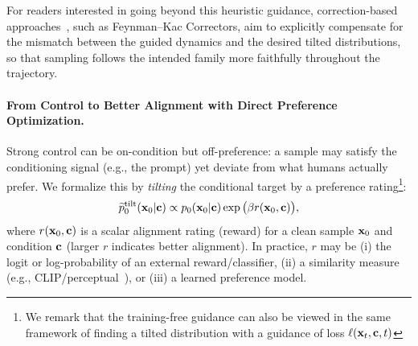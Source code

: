 {For readers interested in going beyond this heuristic guidance, correction-based approaches~\citep{skreta2025feynman}, such as Feynman--Kac Correctors, aim to explicitly compensate for the mismatch between the guided dynamics and the desired tilted distributions, so that sampling follows the intended family more faithfully throughout the trajectory.

}





\paragraph{From Control to Better Alignment with Direct Preference Optimization.}
Strong control can be on-condition but off-preference: a sample may satisfy the conditioning signal (e.g., the prompt) yet deviate from what humans actually prefer. We formalize this by \emph{tilting} the conditional target by a preference rating\footnote{We remark that the training-free guidance can also be viewed in the same framework of finding a tilted distribution with a guidance of loss $\ell({\mathbf{x}}_t, {\mathbf{c}}, t)$}:
\[
\widetilde p_0^{\mathrm{tilt}}({\mathbf{x}}_0| {\mathbf{c}}) \propto p_0({\mathbf{x}}_0|{\mathbf{c}}) \exp \big(\beta r({\mathbf{x}}_0,{\mathbf{c}})\big),
\]
where $r({\mathbf{x}}_0,{\mathbf{c}})$ is a scalar alignment rating (reward) for a clean sample ${\mathbf{x}}_0$ and condition ${\mathbf{c}}$ (larger $r$ indicates better alignment).  In practice, $r$ may be (i) the logit or log-probability of an external reward/classifier, (ii) a similarity measure (e.g., CLIP/perceptual~\citep{radford2021learning}), or (iii) a learned preference model.

